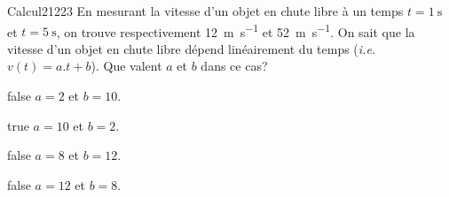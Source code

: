             \begin{question}{27}{Calcul}{2}{1223}
                En mesurant la vitesse d'un objet en chute libre à un temps $t=\SI{1}{\second}$ et $t=\SI{5}{\second}$, on trouve respectivement \SI{12}{\meter\per\second} et \SI{52}{\meter\per\second}. On sait que la vitesse d'un objet en chute libre dépend linéairement du temps (\textit{i.e.} $v(t) = a.t+b$). Que valent $a$ et $b$ dans ce cas?
            \end{question}
            \begin{reponses}
                \item[false] $a=2$ et $b=10$.
                \item[true] $a=10$ et $b=2$.
                \item[false] $a=8$ et $b=12$.
                \item[false] $a=12$ et $b=8$.
            \end{reponses}
